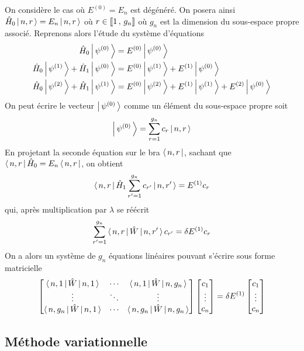     On considère le cas où $E^{(0)} = E_n$ est dégénéré. On posera ainsi $\hat{H}_0 \left| \, n,r \, \right> = E_n \left| \, n,r \, \right>$ où $r \in \left[\!\left[ 1 \, , \, g_n \right]\!\right]$ où $g_n$ est la dimension du sous-espace propre associé. Reprenons alors l’étude du système d’équations 
    \begin{align*}
        \hat{H}_0 \left| \, \psi^{(0)} \, \right> &= E^{(0)} \left| \, \psi^{(0)} \, \right> \\
        \hat{H}_0 \left| \, \psi^{(1)} \, \right> + \hat{H}_1 \left| \, \psi^{(0)} \, \right> &= E^{(0)} \left| \, \psi^{(1)} \, \right> + E^{(1)} \left| \, \psi^{(0)} \, \right> \\  
        \hat{H}_0 \left| \, \psi^{(2)} \, \right> + \hat{H}_1 \left| \, \psi^{(1)} \, \right> &=  E^{(0)} \left| \, \psi^{(2)} \, \right> + E^{(1)} \left| \, \psi^{(1)} \, \right> + E^{(2)} \left| \, \psi^{(0)} \, \right>  
    \end{align*}
    On peut écrire le vecteur $\left| \, \psi^{(0)} \, \right>$ comme un élément du sous-espace propre soit 
    \[ \left| \, \psi^{(0)} \, \right> = \sum_{r=1}^{g_n} c_r \left| \, n,r \, \right> \]   
    En projetant la seconde équation sur le bra $\left< \, n,r \, \right|$, sachant que $\left< \, n,r \, \right| \hat{H}_0 = E_n \left< \, n,r \, \right|$, on obtient 
    \[ \left< \, n,r \, \right| \hat{H}_1 \sum_{r' = 1}^{g_n} c_{r'} \left| \, n, r' \, \right> = E^{(1)} c_r \]   
    qui, après multiplication par $\lambda$ se réécrit 
    \[ \sum_{r'=1}^{g_n} \left< \, n,r \, \right| \hat{W} \left| \, n,r' \, \right>c_{r'} = \delta E^{(1)} c_r \]   
    On a alors un système de $g_n$ équations linéaires pouvant s’écrire sous forme matricielle
    \[ \begin{bmatrix}
        \left< \, n,1 \, \right| \hat{W} \left| \, n,1 \, \right> & \cdots & \left< \, n,1 \, \right| \hat{W} \left| \, n,g_n \, \right> \\
        \vdots & \ddots & \vdots \\
        \left< \, n,g_n \, \right| \hat{W} \left| \, n,1 \, \right> & \cdots & \left< \, n,g_n \, \right| \hat{W} \left| \, n,g_n \, \right> \\
    \end{bmatrix} 
    \begin{bmatrix}
        c_1 \\
        \vdots \\
        c_n
    \end{bmatrix} = \delta E^{(1)} \begin{bmatrix}
        c_1 \\
        \vdots \\
        c_n
    \end{bmatrix} \]    

    \subsection{Méthode variationnelle}

